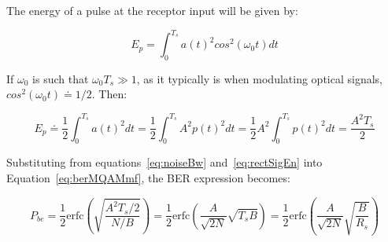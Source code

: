 \begin{refsection}
The energy of a pulse at the receptor input will be given by:

\begin{equation}
E_p = \int_{0}^{T_s} {a(t)^2cos^2(\omega_0 t)} dt
\end{equation}

If $\omega_0$ is such that $\omega_0 T_s \gg 1$, as it typically is when modulating optical signals, $cos^2(\omega_0 t) \doteq 1/2$. Then:

\begin{equation}\label{eq:rectSigEn}
E_p \doteq \frac{1}{2}\int_{0}^{T_s} a(t)^2 dt = \frac{1}{2}\int_{0}^{T_s} A^2 p(t)^2 dt=\frac{1}{2} A^2 \int_{0}^{T_s} p(t)^2 dt= \frac{A^2 T_s}{2}
\end{equation}

Substituting from equations~\ref{eq:noiseBw} and~\ref{eq:rectSigEn} into Equation~\ref{eq:berMQAMmf}, the BER expression becomes:

\begin{equation}\label{eq:berMod}
P_{be} = \frac{1}{2} \text{erfc}\left(\sqrt{\frac{A^2 T_s / 2}{ N / B}}\right) =
\frac{1}{2} \text{erfc}\left(\frac{A}{\sqrt{2N}} \sqrt{{T_s}{B}}\right) =
\frac{1}{2} \text{erfc}\left(\frac{A}{\sqrt{2N}} \sqrt{\frac{B}{R_s}}\right)
\end{equation}


%




\end{refsection}
